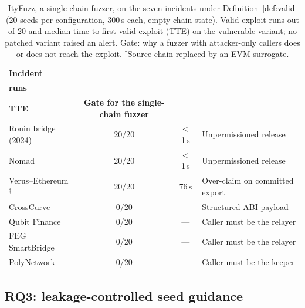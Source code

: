 \documentclass[a4paper]{cas-sc}
\newcommand{\hd}[1]{{\bfseries\boldmath #1}}
\begin{document}
\begin{table}[pos=t,belowcap=4pt]
\centering
\caption{ItyFuzz, a single-chain fuzzer, on the seven incidents under Definition~\ref{def:valid} (20 seeds per configuration, 300\,s each, empty chain state). Valid-exploit runs out of 20 and median time to first valid exploit (TTE) on the vulnerable variant; no patched variant raised an alert. Gate: why a fuzzer with attacker-only callers does or does not reach the exploit. $^{\dagger}$Source chain replaced by an EVM surrogate.}
\label{tab:ityfuzz}
\footnotesize
\begin{tabular*}{\linewidth}{@{\extracolsep{\fill}}lccl@{}}
\toprule
\hd{Incident} & \begin{tabular}[b]{@{}c@{}}\hd{Valid}\\ \hd{runs}\end{tabular} & \begin{tabular}[b]{@{}c@{}}\hd{Median}\\ \hd{TTE}\end{tabular} & \hd{Gate for the single-chain fuzzer} \\
\midrule
Ronin bridge (2024)         & 20/20 & $<$1\,s & Unpermissioned release \\
Nomad                       & 20/20 & $<$1\,s & Unpermissioned release \\
Verus--Ethereum$^{\dagger}$ & 20/20 & 76\,s   & Over-claim on committed export \\
CrossCurve                  & 0/20  & ---     & Structured ABI payload \\
Qubit Finance               & 0/20  & ---     & Caller must be the relayer \\
FEG SmartBridge             & 0/20  & ---     & Caller must be the relayer \\
PolyNetwork                 & 0/20  & ---     & Caller must be the keeper \\
\bottomrule
\end{tabular*}
\end{table}

\subsection{RQ3: leakage-controlled seed guidance}\label{sec:rq-seeds}
\end{document}
